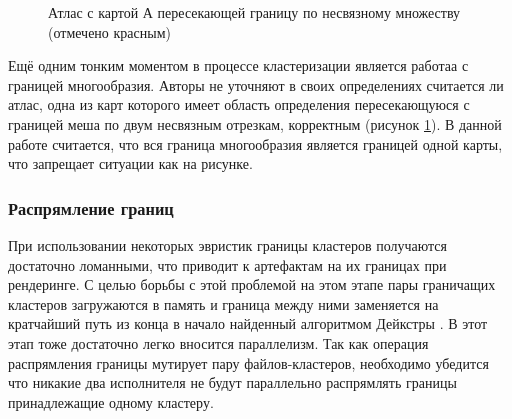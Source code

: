 \documentclass[12pt]{extarticle}
\begin{document}
\begin{figure}[ht]
\centering
{}
\caption{Атлас с картой А пересекающей границу по несвязному множеству (отмечено красным)}
\label{fig:weird_edge}
\end{figure}
Ещё одним тонким моментом в процессе кластеризации является работаа с границей многообразия. Авторы \cite{purnomo2004} не уточняют в своих определениях считается ли атлас, одна из карт которого имеет область определения пересекающуюся с границей меша по двум несвязным отрезкам, корректным (рисунок \ref{fig:weird_edge}). В данной работе считается, что вся граница многообразия является границей одной карты, что запрещает ситуации как на рисунке.

\subsubsection{Распрямление границ}
При использовании некоторых эвристик границы кластеров получаются достаточно ломанными, что приводит к артефактам на их границах при рендеринге. С целью борьбы с этой проблемой на этом этапе пары граничащих кластеров загружаются в память и граница между ними заменяется на кратчайший путь из конца в начало найденный алгоритмом Дейкстры \cite{dijkstra}. В этот этап тоже достаточно легко вносится параллелизм. Так как операция распрямления границы мутирует пару файлов-кластеров, необходимо убедится что никакие два исполнителя не будут параллельно распрямлять границы принадлежащие одному кластеру.
\end{document}
